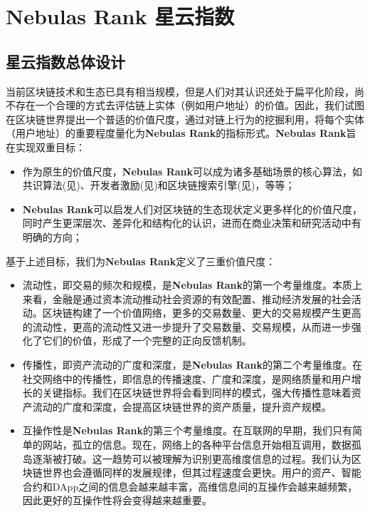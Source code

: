 \section{Nebulas Rank 星云指数}
\label{sec:rank}

\subsection{星云指数总体设计} \label{subsec:value}
当前区块链技术和生态已具有相当规模，但是人们对其认识还处于扁平化阶段，尚不存在一个合理的方式去评估链上实体（例如用户地址）的价值。因此，我们试图在区块链世界提出⼀个普适的价值尺度，通过对链上行为的挖掘利用，将每个实体（用户地址）的重要程度量化为\textbf{Nebulas Rank}的指标形式。\textbf{Nebulas Rank}旨在实现双重目标：
\begin{itemize}
	\item 作为原生的价值尺度，\textbf{Nebulas Rank}可以成为诸多基础场景的核心算法，如共识算法(见)、开发者激励(见)和区块链搜索引擎(见)，等等；
	\item \textbf{Nebulas Rank}可以启发人们对区块链的生态现状定义更多样化的价值尺度，同时产生更深层次、差异化和结构化的认识，进而在商业决策和研究活动中有明确的方向；
\end{itemize}
基于上述目标，我们为\textbf{Nebulas Rank}定义了三重价值尺度：
\begin{itemize}
	\item 流动性，即交易的频次和规模，是\textbf{Nebulas Rank}的第⼀个考量维度。本质上来看，⾦融是通过资本流动推动社会资源的有效配置、推动经济发展的社会活动。区块链构建了⼀个价值⽹络，更多的交易数量、更⼤的交易规模产⽣更⾼的流动性，更⾼的流动性又进⼀步提升了交易数量、交易规模，从⽽进⼀步强化了它们的价值，形成了⼀个完整的正向反馈机制。
	\item 传播性，即资产流动的⼴度和深度，是\textbf{Nebulas Rank}的第⼆个考量维度。在社交网络中的传播性，即信息的传播速度、⼴度和深度，是⽹络质量和⽤户增长的关键指标。我们在区块链世界将会看到同样的模式，强⼤传播性意味着资产流动的⼴度和深度，会提⾼区块链世界的资产质量，提升资产规模。
	\item 互操作性是\textbf{Nebulas Rank}的第三个考量维度。在互联⽹的早期，我们只有简单的⽹站，孤⽴的信息。现在，⽹络上的各种平台信息开始相互调⽤，数据孤岛逐渐被打破。这⼀趋势可以被理解为识别更⾼维度信息的过程。我们认为区块链世界也会遵循同样的发展规律，但其过程速度会更快。⽤户的资产、智能合约和DApp之间的信息会越来越丰富，⾼维信息间的互操作会越来越频繁，因此更好的互操作性将会变得越来越重要。
\end{itemize}

